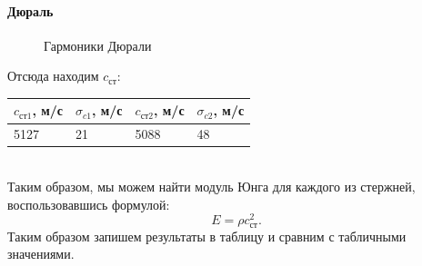 \documentclass[a4paper, 12pt]{article}%
\begin{document}
\paragraph*{Дюраль}
\begin{figure}[h!]
\caption{Гармоники Дюрали}
\end{figure}
Отсюда находим $c_{\text{ст}}$:
\begin{table}[h!]
\begin{tabular}{|l|l|l|l|}
\hline
$c_{\text{ст1}}$, м/с & $\sigma_{c1}$, м/с & $c_{\text{ст2}}$, м/с & $\sigma_{c2}$, м/с \\ \hline
5127                  & 21                  & 5088                  & 48 \\ \hline
\end{tabular}
\end{table}
\\
Таким образом, мы можем найти модуль Юнга для каждого из стержней, воспользовавшись формулой:
\begin{equation}
E=\rho c_{\text{ст}}^2.
\end{equation}
Таким образом запишем результаты в таблицу и сравним с табличными значениями.
\end{document}
